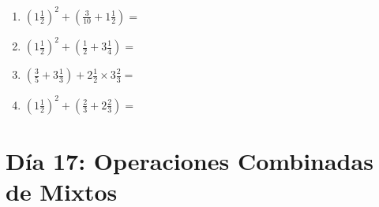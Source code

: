 \documentclass[12pt]{article}
\begin{document}
\begin{enumerate}
\item \large $ (1 \frac{1}{2})^2 + (\frac{3}{10} + 1 \frac{1}{2}) = $ \vspace{1.8cm}
\item \large $ (1 \frac{1}{2})^2 + (\frac{1}{2} + 3 \frac{1}{4}) = $ \vspace{1.8cm}
\item \large $ (\frac{3}{5} + 3 \frac{1}{3}) + 2 \frac{1}{2} \times 3 \frac{2}{3} = $ \vspace{1.8cm}
\item \large $ (1 \frac{1}{2})^2 + (\frac{2}{3} + 2 \frac{2}{3}) = $ \vspace{1.8cm}
\end{enumerate}\newpage
\section*{Día 17: Operaciones Combinadas de Mixtos}
\end{document}
